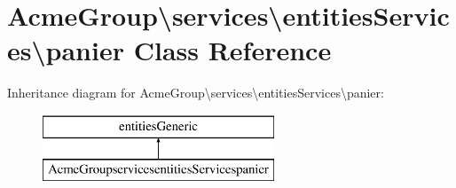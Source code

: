 \hypertarget{class_acme_group_1_1services_1_1entities_services_1_1panier}{\section{Acme\+Group\textbackslash{}services\textbackslash{}entities\+Services\textbackslash{}panier Class Reference}
\label{class_acme_group_1_1services_1_1entities_services_1_1panier}
}
Inheritance diagram for Acme\+Group\textbackslash{}services\textbackslash{}entities\+Services\textbackslash{}panier\+:\begin{figure}[H]
\begin{center}
\leavevmode
\includegraphics[height=2.000000cm]{class_acme_group_1_1services_1_1entities_services_1_1panier}
\end{center}
\end{figure}

